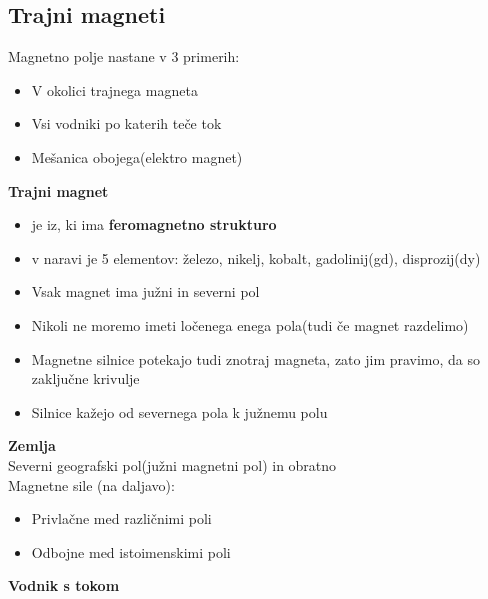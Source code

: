 {\color{indiagreen}\subsection{Trajni magneti}}
Magnetno polje nastane v 3 primerih:
\begin{itemize}
	\item V okolici trajnega magneta
	\item Vsi vodniki po katerih teče tok
	\item Mešanica obojega(elektro magnet)
\end{itemize}
\textbf{Trajni magnet}\\
\begin{itemize}
	\item je iz, ki ima \textbf{feromagnetno strukturo}
	\item v naravi je 5 elementov: železo, nikelj, kobalt, gadolinij(gd), disprozij(dy)
	\item Vsak magnet ima južni in severni pol
	\item Nikoli ne moremo imeti ločenega enega pola(tudi če magnet razdelimo)
	\item Magnetne silnice potekajo tudi znotraj magneta, zato jim pravimo, da so zaključne krivulje
	\item Silnice kažejo od severnega pola k južnemu polu
\end{itemize}
\textbf{Zemlja}\\
Severni geografski pol(južni magnetni pol) in obratno\\
Magnetne sile (na daljavo):
\begin{itemize}
	\item Privlačne med različnimi poli
	\item Odbojne med istoimenskimi poli
\end{itemize}
\textbf{Vodnik s tokom}\\

